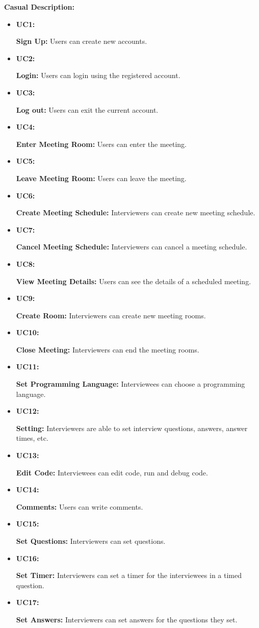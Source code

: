 \documentclass{article}
\begin{document}
   \textbf{Casual Description: }
   \begin{itemize}
    \item \textbf{UC1:} \par \textbf{Sign Up:} Users can create new accounts.
    \item \textbf{UC2:} \par \textbf{Login:} Users can login using the registered account.
    \item \textbf{UC3:} \par \textbf{Log out:} Users can exit the current account.
    \item \textbf{UC4:} \par \textbf{Enter Meeting Room:} Users can enter the meeting.
    \item \textbf{UC5:} \par \textbf{Leave Meeting Room:} Users can leave the meeting.
    \item \textbf{UC6:} \par \textbf{Create Meeting Schedule:} Interviewers can create new meeting schedule.
    \item \textbf{UC7:} \par \textbf{Cancel Meeting Schedule:} Interviewers can cancel a meeting schedule.
    \item \textbf{UC8:} \par \textbf{View Meeting Details:} Users can see the details of a scheduled meeting.
    \item \textbf{UC9:} \par \textbf{Create Room:} Interviewers can create new meeting rooms.
    \item \textbf{UC10:} \par \textbf{Close Meeting:} Interviewers can end the meeting rooms.
    \item \textbf{UC11:} \par \textbf{Set Programming Language:} Interviewees can choose a programming language.
    \item \textbf{UC12:} \par \textbf{Setting:} Interviewers are able to set interview questions, answers, answer times, etc.
    \item \textbf{UC13:} \par \textbf{Edit Code:} Interviewees can edit code, run and debug code.
    \item \textbf{UC14:} \par \textbf{Comments:} Users can write comments.
    \item \textbf{UC15:} \par \textbf{Set Questions:} Interviewers can set questions.
    \item \textbf{UC16:} \par \textbf{Set Timer:} Interviewers can set a timer for the interviewees in a timed question.
    \item \textbf{UC17:} \par \textbf{Set Answers:} Interviewers can set answers for the questions they set.

   \end{itemize}
\end{document}
